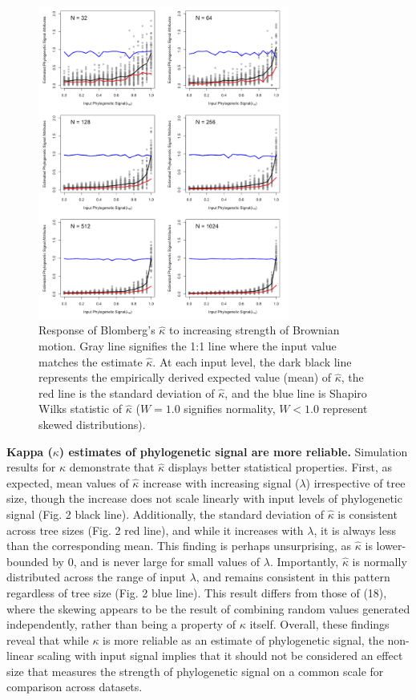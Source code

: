 \documentclass[9pt,twocolumn,twoside,lineno]{pnas-new}
\begin{document}
\begin{figure}
\centering
\includegraphics[width=8.25cm]{fig.2.png}
\caption{Response of Blomberg's \(\hat\kappa\) to increasing strength of Brownian motion. Gray line signifies the 1:1 line where the input value matches the estimate \(\hat\kappa\). At each input level, the dark black line represents the empirically derived expected value (mean) of
\(\hat\kappa\), the red line is the standard deviation of
\(\hat\kappa\), and the blue line is Shapiro Wilks statistic of
\(\hat\kappa\) (\(W=1.0\) signifies normality, \(W< 1.0\) represent
skewed distributions).{}}
\end{figure}

\textbf{Kappa (\(\kappa\)) estimates of phylogenetic signal are more
reliable.} Simulation results for \(\hat\kappa\) demonstrate that
\(\hat\kappa\) displays better statistical properties. First, as
expected, mean values of \(\hat\kappa\) increase with increasing signal
(\(\lambda\)) irrespective of tree size, though the increase does not
scale linearly with input levels of phylogenetic signal (Fig. 2 black
line). Additionally, the standard deviation of \(\hat\kappa\) is
consistent across tree sizes (Fig. 2 red line), and while it increases
with \(\lambda\), it is always less than the corresponding mean. This
finding is perhaps unsurprising, as \(\hat\kappa\) is lower-bounded by
0, and is never large for small values of \(\lambda\). Importantly,
\(\hat\kappa\) is normally distributed across the range of input
\(\lambda\), and remains consistent in this pattern regardless of tree
size (Fig. 2 blue line). This result differs from those of (18), where
the skewing appears to be the result of combining random values
generated independently, rather than being a property of \(\kappa\)
itself. Overall, these findings reveal that while \(\kappa\) is more
reliable as an estimate of phylogenetic signal, the non-linear scaling
with input signal implies that it should not be considered an effect
size that measures the strength of phylogenetic signal on a common scale
for comparison across datasets.
\end{document}
